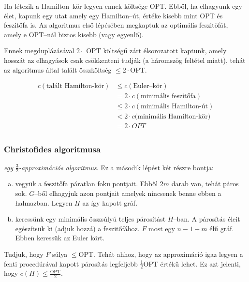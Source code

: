 Ha létezik a Hamilton--kör legyen ennek költsége OPT. Ebből, ha elhagyunk egy
élet, kapunk egy utat amely egy Hamilton--út, értéke kisebb mint OPT és
feszitőfa is. Az algoritmus első lépésében megkaptuk az optimális feszitőfát,
amely e OPT--nál biztos kisebb (vagy egyenlő).

Ennek megduplázásával $2 \cdot$ OPT költségű zárt élsorozatott kaptunk, amely
hosszát az elhagyások csak csökkenteni tudják (a háromszög feltétel miatt),
tehát az algoritmus által talált összköltség $\leq 2 \cdot$OPT.

\begin{align*}
	c(\mbox{talált Hamilton-kör}) & \leq c(\mbox{Euler--kör})                    \\
	                              & = 2  \cdot c(\mbox{minimális feszítőfa})     \\
	                              & \leq 2 \cdot c(\mbox{minimális Hamilton-út}) \\
	                              & < 2\cdot c(\mbox{minimális Hamilton-kör)}    \\
	                              & = 2\cdot OPT                                 \\
\end{align*}

\subsubsection{Christofides algoritmusa}

\emph{egy $\frac{3}{2}$-approximációs algoritmus}. Ez a második lépést két részre bontja:

\begin{enumerate}[(a)]
	\item vegyük a feszitőfa páratlan foku pontjait. Ebből $2m$ darab van, tehát
	      páros sok. $G$--ből elhagyjuk azon pontjait amelyek nincsenek benne ebben a
	      halmazban. Legyen $H$ az így kapott gráf.
	\item keressünk egy minimális összsúlyú teljes párosítást $H$--ban. A párosítás
	      éleit egészítsük ki (adjuk hozzá) a feszitőfához. $F$ most egy $n-1+m$ élű gráf.
	      Ebben keressük az Euler kört.
\end{enumerate}

Tudjuk, hogy $F$ súlya $\leq$OPT. Tehát ahhoz, hogy az approximáció igaz legyen
a fenti procedúrával kapott párosítás legfeljebb $\frac{1}{2}$OPT értékű lehet.
Ez azt jelenti, hogy $c(H) \leq \frac{\mbox{OPT}}{2}$.

